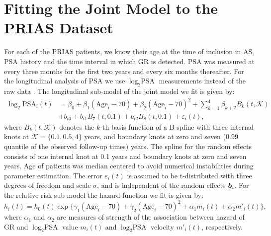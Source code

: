 
\section{Fitting the Joint Model to the PRIAS Dataset}
\label{sec : param_estimates_jm_fit_prias}
For each of the PRIAS patients, we know their age at the time of inclusion in AS, PSA history and the time interval in which GR is detected. PSA was measured at every three months for the first two years and every six months thereafter. For the longitudinal analysis of PSA we use $\log_2 \mbox{PSA}$ measurements instead of the raw data \citep{nieboer2015nonlinear}. The longitudinal sub-model of the joint model we fit is given by:
\begin{equation}
\label{eq : long_model_prias_web}
\begin{aligned}
\log_2 \mbox{PSA}_i(t) &= \beta_0 + \beta_1 (\mbox{Age}_i-70) + \beta_2 (\mbox{Age}_i-70)^2 + \sum_{k=1}^4 \beta_{k+2} B_k(t,\mathcal{K})\\ 
&+  b_{i0} + b_{i1} B_7(t, 0.1) + b_{i2} B_8(t, 0.1) +
\varepsilon_i(t),
\end{aligned}
\end{equation}
where $B_k(t, \mathcal{K})$ denotes the $k$-th basis function of a B-spline with three internal knots at $\mathcal{K} =\{0.1, 0.5, 4\}$ years, and boundary knots at zero and seven (0.99 quantile of the observed follow-up times) years. The spline for the random effects consists of one internal knot at 0.1 years and boundary knots at zero and seven years. Age of patients was median centered to avoid numerical instabilities during parameter estimation. The error $\varepsilon_i(t)$ is assumed to be t-distributed with three degrees of freedom and scale $\sigma$, and is independent of the random effects $\boldsymbol{b}_i$. For the relative risk sub-model the hazard function we fit is given by:
\begin{equation}
\label{eq : hazard_prias_web}
h_i(t) = h_0(t) \exp\big\{\gamma_1 (\mbox{Age}_i-70)  + \gamma_2 (\mbox{Age}_i-70)^2 + \alpha_1 m_i(t) + \alpha_2 m'_i(t)\big\},
\end{equation}
where $\alpha_1$ and $\alpha_2$ are measures of strength of the association between hazard of GR and $\log_2 \mbox{PSA}$ value $m_i(t)$ and $\log_2 \mbox{PSA}$ velocity $m'_i(t)$, respectively.

